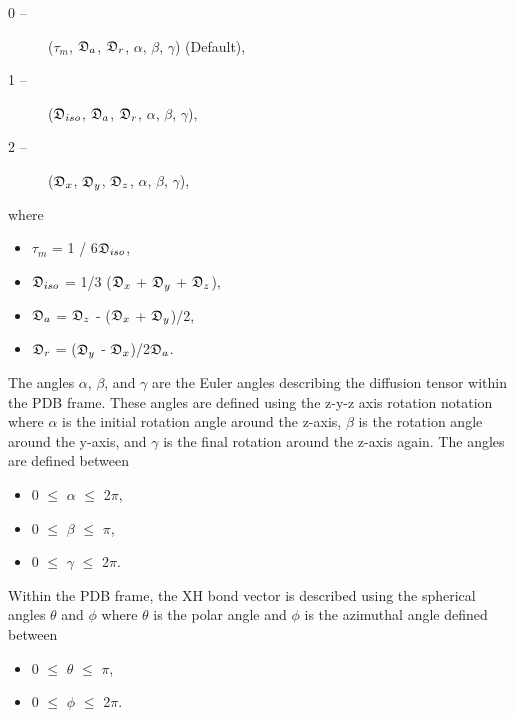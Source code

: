 \begin{description}
\item[0 --]  ($\tau_m$, $\mathfrak{D}_a$, $\mathfrak{D}_r$, $\alpha$, $\beta$, $\gamma$)   (Default), 
\item[1 --]  ($\mathfrak{D}_{iso}$, $\mathfrak{D}_a$, $\mathfrak{D}_r$, $\alpha$, $\beta$, $\gamma$), 
\item[2 --]  ($\mathfrak{D}_x$, $\mathfrak{D}_y$, $\mathfrak{D}_z$, $\alpha$, $\beta$, $\gamma$), 
\end{description}


where


\begin{itemize}
\item[] $\tau_m$ = 1 / 6$\mathfrak{D}_{iso}$, 
\item[] $\mathfrak{D}_{iso}$ = 1/3 ($\mathfrak{D}_x$ + $\mathfrak{D}_y$ + $\mathfrak{D}_z$), 
\item[] $\mathfrak{D}_a$ = $\mathfrak{D}_z$ - ($\mathfrak{D}_x$ + $\mathfrak{D}_y$)/2, 
\item[] $\mathfrak{D}_r$ = ($\mathfrak{D}_y$ - $\mathfrak{D}_x$)/2$\mathfrak{D}_a$. 
\end{itemize}


The angles $\alpha$, $\beta$, and $\gamma$ are the Euler angles describing the diffusion tensor within the PDB frame.  These angles are defined using the z-y-z axis rotation notation where $\alpha$ is the initial rotation angle around the z-axis, $\beta$ is the rotation angle around the y-axis, and $\gamma$ is the final rotation around the z-axis again.  The angles are defined between


\begin{itemize}
\item[] 0 $\le$ $\alpha$ $\le$ 2$\pi$, 
\item[] 0 $\le$ $\beta$ $\le$ $\pi$, 
\item[] 0 $\le$ $\gamma$ $\le$ 2$\pi$. 
\end{itemize}


Within the PDB frame, the XH bond vector is described using the spherical angles $\theta$ and $\phi$ where $\theta$ is the polar angle and $\phi$ is the azimuthal angle defined between


\begin{itemize}
\item[] 0 $\le$ $\theta$ $\le$ $\pi$, 
\item[] 0 $\le$ $\phi$ $\le$ 2$\pi$. 
\end{itemize}



